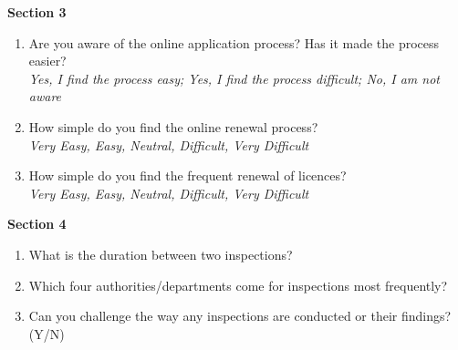 \documentclass[a4paper, 12pt, twoside]{article}
\begin{document}
\begin{mdframed}[backgroundcolor=gray!20]
	
\textbf{Section 3}
		\begin {enumerate}[nosep]
		\item Are you aware of the online application process? Has it made the process easier?\\
		\textit{Yes, I find the process easy; Yes, I find the process difficult; No, I am not aware}
		\item How simple do you find the online renewal process?\\
		\textit{Very Easy, Easy, Neutral, Difficult, Very Difficult}
		\item How simple do you find the frequent renewal of licences?\\
		\textit{Very Easy, Easy, Neutral, Difficult, Very Difficult}
		\end {enumerate}


\textbf{Section 4}
		\begin {enumerate} [nosep]
		\item What is the duration between two inspections?
		\item Which four authorities/departments come for inspections most frequently?
		\item Can you challenge the way any inspections are conducted or their findings? (Y/N)
		\end {enumerate} 



\end{mdframed}
\end{document}
